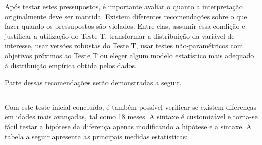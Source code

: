 \documentclass[
]{book}
\newenvironment{Shaded}{\begin{snugshade}}{\end{snugshade}}
\newcommand{\DataTypeTok}[1]{\textcolor[rgb]{0.13,0.29,0.53}{#1}}
\newcommand{\DecValTok}[1]{\textcolor[rgb]{0.00,0.00,0.81}{#1}}
\newcommand{\KeywordTok}[1]{\textcolor[rgb]{0.13,0.29,0.53}{\textbf{#1}}}
\newcommand{\NormalTok}[1]{#1}
\newcommand{\OperatorTok}[1]{\textcolor[rgb]{0.81,0.36,0.00}{\textbf{#1}}}
\newcommand{\StringTok}[1]{\textcolor[rgb]{0.31,0.60,0.02}{#1}}
\begin{document}
Após testar estes pressupostos, é importante avaliar o quanto a interpretação originalmente deve ser mantida. Existem diferentes recomendações sobre o que fazer quando os pressupostos são violados. Entre elas, assumir essa condição e justificar a utilização do Teste T, transformar a distribuição da variável de interesse, usar versões robustas do Teste T, usar testes não-paramétricos com objetivos próximos ao Teste T ou eleger algum modelo estatístico mais adequado à distribuição empírica obtida pelos dados.

Parte dessas recomendações serão demonstradas a seguir.

\begin{center}\rule{0.5\linewidth}{0.5pt}\end{center}

Com este teste inicial concluído, é também possível verificar se existem diferenças em idades mais avançadas, tal como 18 meses. A sintaxe é customizável e torna-se fácil testar a hipótese da diferença apenas modificando a hipótese e a sintaxe. A tabela a seguir apresenta as principais medidas estatísticas:

\begin{Shaded}
\end{Shaded}
\end{document}
